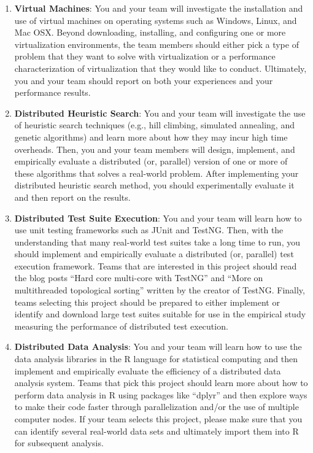 \begin{enumerate}
  \item {\bf Virtual Machines}: You and your team will investigate the installation and use of virtual machines on
    operating systems such as Windows, Linux, and Mac OSX.  Beyond downloading, installing, and configuring one or more
    virtualization environments, the team members should either pick a type of problem that they want to solve with
    virtualization or a performance characterization of virtualization that they would like to conduct. Ultimately, you
    and your team should report on both your experiences and your performance results.

  \item {\bf Distributed Heuristic Search}: You and your team will investigate the use of heuristic search techniques
    (e.g., hill climbing, simulated annealing, and genetic algorithms) and learn more about how they may incur high time
    overheads. Then, you and your team members will design, implement, and empirically evaluate a distributed (or,
    parallel) version of one or more of these algorithms that solves a real-world problem. After implementing your
    distributed heuristic search method, you should experimentally evaluate it and then report on the results.

  \item {\bf Distributed Test Suite Execution}: You and your team will learn how to use unit testing frameworks such as
    JUnit and TestNG. Then, with the understanding that many real-world test suites take a long time to run, you should
    implement and empirically evaluate a distributed (or, parallel) test execution framework. Teams that are interested
    in this project should read the blog posts ``Hard core multi-core with TestNG'' and ``More on multithreaded
    topological sorting'' written by the creator of TestNG. Finally, teams selecting this project should be prepared to
    either implement or identify and download large test suites suitable for use in the empirical study measuring the
    performance of distributed test execution.

  \item {\bf Distributed Data Analysis}: You and your team will learn how to use the data analysis libraries in the R
    language for statistical computing and then implement and empirically evaluate the efficiency of a distributed data
    analysis system. Teams that pick this project should learn more about how to perform data analysis in R using
    packages like ``dplyr'' and then explore ways to make their code faster through parallelization and/or the use of
    multiple computer nodes. If your team selects this project, please make sure that you can identify several
    real-world data sets and ultimately import them into R for subsequent analysis.


\end{enumerate}
